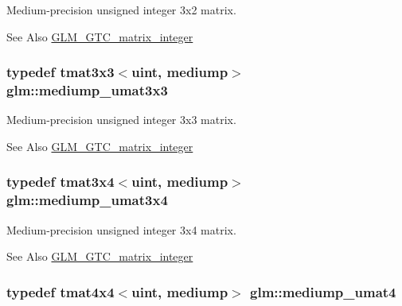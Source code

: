 Medium-\/precision unsigned integer 3x2 matrix. \begin{DoxySeeAlso}{See Also}
\hyperlink{group__gtc__matrix__integer}{G\-L\-M\-\_\-\-G\-T\-C\-\_\-matrix\-\_\-integer} 
\end{DoxySeeAlso}
\hypertarget{group__gtc__matrix__integer_gaa55f7815a399a780907a1dcd4caef7d9}{
\subsubsection[{mediump\-\_\-umat3x3}]{\setlength{\rightskip}{0pt plus 5cm}typedef tmat3x3$<$uint, mediump$>$ {\bf glm\-::mediump\-\_\-umat3x3}}}\label{group__gtc__matrix__integer_gaa55f7815a399a780907a1dcd4caef7d9}
Medium-\/precision unsigned integer 3x3 matrix. \begin{DoxySeeAlso}{See Also}
\hyperlink{group__gtc__matrix__integer}{G\-L\-M\-\_\-\-G\-T\-C\-\_\-matrix\-\_\-integer} 
\end{DoxySeeAlso}
\hypertarget{group__gtc__matrix__integer_ga21a2361cc10822ad1a2297ac286c8e26}{
\subsubsection[{mediump\-\_\-umat3x4}]{\setlength{\rightskip}{0pt plus 5cm}typedef tmat3x4$<$uint, mediump$>$ {\bf glm\-::mediump\-\_\-umat3x4}}}\label{group__gtc__matrix__integer_ga21a2361cc10822ad1a2297ac286c8e26}
Medium-\/precision unsigned integer 3x4 matrix. \begin{DoxySeeAlso}{See Also}
\hyperlink{group__gtc__matrix__integer}{G\-L\-M\-\_\-\-G\-T\-C\-\_\-matrix\-\_\-integer} 
\end{DoxySeeAlso}
\hypertarget{group__gtc__matrix__integer_ga3eb3a5d85ec876ba65fad5525a5dda56}{
\subsubsection[{mediump\-\_\-umat4}]{\setlength{\rightskip}{0pt plus 5cm}typedef tmat4x4$<$uint, mediump$>$ {\bf glm\-::mediump\-\_\-umat4}}}\label{group__gtc__matrix__integer_ga3eb3a5d85ec876ba65fad5525a5dda56}
